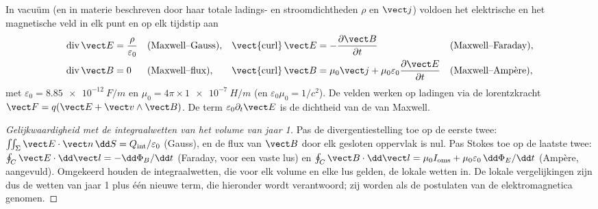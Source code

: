 \begin{theorem}\label{thm:b2:maxwell-equations:maxwell}
In vacuüm (en in materie beschreven door haar totale ladings- en
stroomdichtheden $\rho$ en $\vect j$) voldoen het elektrische en het
magnetische veld in elk punt en op elk tijdstip aan
\begin{align*}
\operatorname{div}\vect E &= \frac\rho{\varepsilon_0} &&\text{(Maxwell--Gauss)} , &
\operatorname{\vect{curl}}\vect E &= -\frac{\partial\vect B}{\partial t} &&\text{(Maxwell--Faraday)} ,\\
\operatorname{div}\vect B &= 0 &&\text{(Maxwell--flux)} , &
\operatorname{\vect{curl}}\vect B &= \mu_0\vect j + \mu_0\varepsilon_0\frac{\partial\vect E}{\partial t} &&\text{(Maxwell--Ampère)} ,
\end{align*}
met $\varepsilon_0 = \qty{8.85e-12}{F/m}$ en
$\mu_0 = 4\pi \times \qty{1e-7}{H/m}$ (en $\varepsilon_0\mu_0 = 1/c^2$). De
velden werken op ladingen via de lorentzkracht
$\vect F = q(\vect E + \vect v\wedge\vect B)$. De term
$\varepsilon_0\partial_t\vect E$ is de dichtheid van de
\emph{} van Maxwell.
\end{theorem}

\begin{proof}[Gelijkwaardigheid met de integraalwetten van het volume van jaar 1]
Pas de divergentiestelling toe op de eerste twee:
$\iint_\Sigma\vect E\cdot
\vect n\,\dd S = Q_{\text{int}}/\varepsilon_0$
(Gauss), en de flux van $\vect B$ door elk gesloten oppervlak is nul. Pas
Stokes toe op de laatste twee:
$\oint_C\vect E\cdot\dd\vect l = -\dd\Phi_B/\dd t$ (Faraday, voor een vaste
lus) en
$\oint_C\vect B\cdot\dd\vect l = \mu_0I_{\text{oms}} + \mu_0\varepsilon_0\,\dd\Phi_E/\dd t$
(Ampère, aangevuld). Omgekeerd houden de integraalwetten, die voor elk
volume en elke lus gelden, de lokale wetten in. De lokale vergelijkingen
zijn dus de wetten van jaar 1 plus één nieuwe term, die hieronder wordt
verantwoord; zij worden als de postulaten van de elektromagnetica genomen.
\end{proof}

